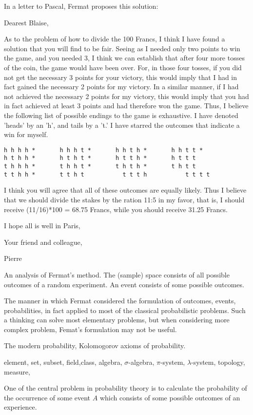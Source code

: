 \documentclass[10pt,a4paper]{book}
\begin{document}
In a letter to Pascal, Fermat proposes this solution:


Dearest Blaise,

As to the problem of how to divide the 100 Francs, I think I have found a solution that you will find to be fair. Seeing as I needed only two points to win the game, and you needed 3, I think we can establish that after four more tosses of the coin, the game would have been over. For, in those four tosses, if you did not get the necessary 3 points for your victory, this would imply that I had in fact gained the necessary 2 points for my victory. In a similar manner, if I had not achieved the necessary 2 points for my victory, this would imply that you had in fact achieved at least 3 points and had therefore won the game. Thus, I believe the following list of possible endings to the game is exhaustive. I have denoted 'heads' by an 'h', and tails by a 't.' I have starred the outcomes that indicate a win for myself.
\begin{verbatim}
h h h h * 	  	h h h t * 	  	h h t h * 	  	h h t t *
h t h h * 	  	h t h t * 	  	h t t h * 	  	h t t t
t h h h * 	  	t h h t * 	  	t h t h * 	  	t h t t
t t h h * 	  	t t h t 	  	  t t t h 	    	t t t t
\end{verbatim}

I think you will agree that all of these outcomes are equally likely. Thus I believe that we should divide the stakes by the ration 11:5 in my favor, that is, I should receive (11/16)*100 = 68.75 Francs, while you should receive 31.25 Francs.

I hope all is well in Paris,

Your friend and colleague,

Pierre 

An analysis of Fermat's method. The (sample) space consists of all possible outcomes of a random experiment. An event consists of some possible outcomes. 


The manner in which Fermat considered the formulation of outcomes, events, probabilities, in fact applied to most of the classical probabilistic problems. Such a thinking can solve most elementary problems, but when considering more complex problem, Femat's formulation may not be useful.

The modern probability, Kolomogorov axioms of probability.


element, set, subset, field,class, algebra, $ \sigma $-algebra, $ \pi $-system, $ \lambda $-system, topology, measure,

One of the central problem in probability theory is to calculate the probability of the occurrence of some event $ A $ which consists of some possible outcomes of an experience. 
\end{document}
